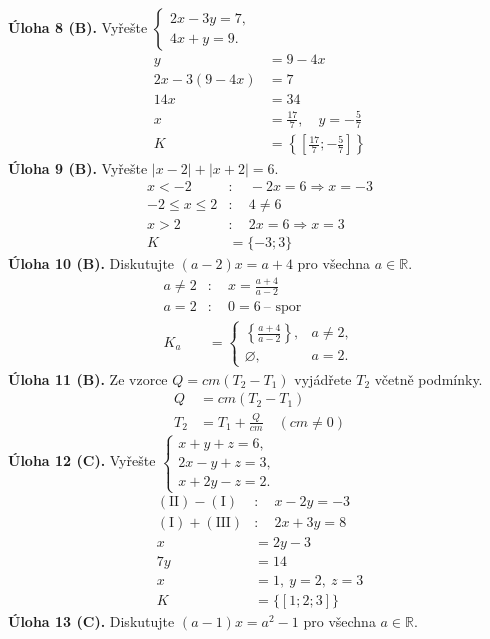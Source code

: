 \documentclass[11pt,a4paper]{article}
\begin{document}
\noindent\textbf{Úloha 8 (B).} Vyřešte $\begin{cases}2x-3y=7,\\4x+y=9.\end{cases}$
\[\begin{aligned}
y&=9-4x \\
2x-3(9-4x)&=7 \\
14x&=34 \\
x&=\frac{17}{7},\quad y=-\frac57 \\
K&=\left\{\left[\frac{17}{7};-\frac57\right]\right\}
\end{aligned}\]
\noindent\textbf{Úloha 9 (B).} Vyřešte $|x-2|+|x+2|=6$.
\[\begin{aligned}
x<-2&:\quad -2x=6\Rightarrow x=-3 \\
-2\le x\le2&:\quad4\ne6 \\
x>2&:\quad2x=6\Rightarrow x=3 \\
K&=\{-3;3\}
\end{aligned}\]
\noindent\textbf{Úloha 10 (B).} Diskutujte $(a-2)x=a+4$ pro všechna $a\in\mathbb R$.
\[\begin{aligned}
a\ne2&:\quad x=\frac{a+4}{a-2} \\
a=2&:\quad0=6\ \text{-- spor} \\
K_a&=\begin{cases}\left\{\frac{a+4}{a-2}\right\},&a\ne2,\\\varnothing,&a=2.\end{cases}
\end{aligned}\]
\noindent\textbf{Úloha 11 (B).} Ze vzorce $Q=cm(T_2-T_1)$ vyjádřete $T_2$ včetně podmínky.
\[\begin{aligned}
Q&=cm(T_2-T_1) \\
T_2&=T_1+\frac{Q}{cm}\quad(cm\ne0)
\end{aligned}\]
\noindent\textbf{Úloha 12 (C).} Vyřešte $\begin{cases}x+y+z=6,\\2x-y+z=3,\\x+2y-z=2.\end{cases}$
\[\begin{aligned}
(\mathrm{II})-(\mathrm I)&:\quad x-2y=-3 \\
(\mathrm I)+(\mathrm{III})&:\quad2x+3y=8 \\
x&=2y-3 \\
7y&=14 \\
x&=1,\ y=2,\ z=3 \\
K&=\{[1;2;3]\}
\end{aligned}\]
\noindent\textbf{Úloha 13 (C).} Diskutujte $(a-1)x=a^2-1$ pro všechna $a\in\mathbb R$.
\end{document}
